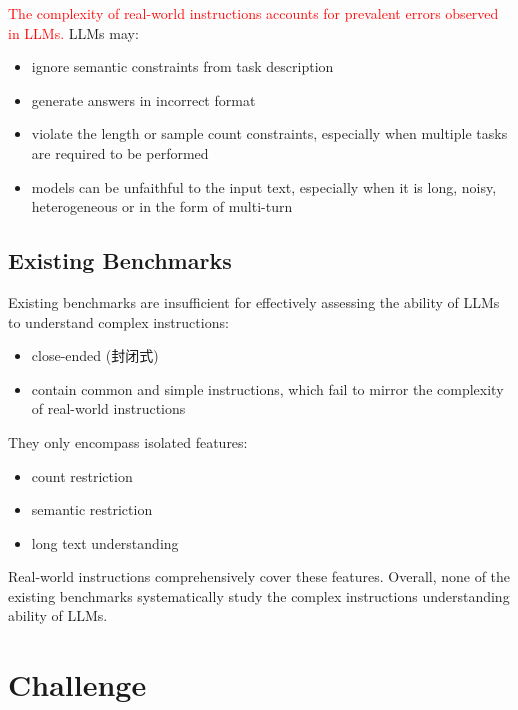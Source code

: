 \documentclass{beamer}
\begin{document}
\begin{frame}
    \textcolor{red}{The complexity of real-world instructions accounts for prevalent errors observed in LLMs.}
    \newline
    LLMs may:
    \begin{itemize}
        \item {ignore semantic constraints from task description}
        \item {generate answers in incorrect format}
        \item {violate the length or sample count constraints, especially when multiple tasks are required to be performed}
        \item {models can be unfaithful to the input text, especially when it is long, noisy, heterogeneous or in the form of multi-turn}
    \end{itemize}

\end{frame}

\subsection{Existing Benchmarks}

\begin{frame}
    Existing benchmarks are insufficient for effectively assessing the ability of LLMs to understand complex instructions:
    \begin{itemize}
        \item {close-ended (封闭式)}
        \item {contain common and simple instructions, which fail to mirror the complexity of real-world instructions}
    \end{itemize}
    They only encompass isolated features:
    \begin{itemize}
        \item {count restriction}
        \item {semantic restriction}
        \item {long text understanding}
    \end{itemize}
    Real-world instructions comprehensively cover these features. Overall, none of the existing benchmarks systematically study the complex instructions understanding ability of LLMs.
\end{frame}

\section{Challenge}
\end{document}
